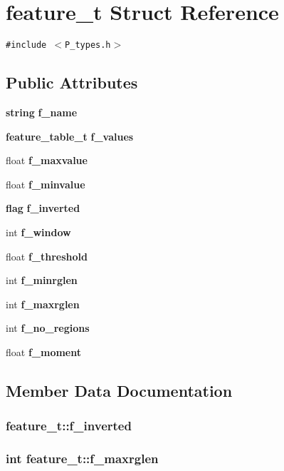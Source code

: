 \section{feature\_\-t  Struct Reference}
\label{structfeature__t}
{\tt \#include $<$P\_\-types.h$>$}

\subsection*{Public Attributes}
\begin{CompactItemize}
\item 
{\bf string} {\bf f\_\-name}
\item 
{\bf feature\_\-table\_\-t} {\bf f\_\-values}
\item 
float {\bf f\_\-maxvalue}
\item 
float {\bf f\_\-minvalue}
\item 
{\bf flag} {\bf f\_\-inverted}
\item 
int {\bf f\_\-window}
\item 
float {\bf f\_\-threshold}
\item 
int {\bf f\_\-minrglen}
\item 
int {\bf f\_\-maxrglen}
\item 
int {\bf f\_\-no\_\-regions}
\item 
float {\bf f\_\-moment}
\end{CompactItemize}


\subsection{Member Data Documentation}
\subsubsection{ feature\_\-t::f\_\-inverted}\label{structfeature__t_m4}


\subsubsection{\setlength{\rightskip}{0pt plus 5cm}int feature\_\-t::f\_\-maxrglen}\label{structfeature__t_m8}


